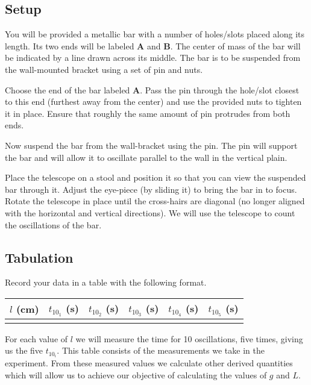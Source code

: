    \subsection*{Setup}

      You will be provided a metallic bar with a number of holes/slots placed along its length. Its two ends will be labeled \textbf{A} and \textbf{B}. The center of mass of the bar will be indicated by a line drawn across its middle. The bar is to be suspended from the wall-mounted bracket using a set of pin and nuts.

      Choose the end of the bar labeled \textbf{A}. Pass the pin through the hole/slot closest to this end (furthest away from the center) and use the provided nuts to tighten it in place. Ensure that roughly the same amount of pin protrudes from both ends.

      Now suspend the bar from the wall-bracket using the pin. The pin will support the bar and will allow it to oscillate parallel to the wall in the vertical plain.

      Place the telescope on a stool and position it so that you can view the suspended bar through it. Adjust the eye-piece (by sliding it) to bring the bar in to focus. Rotate the telescope in place until the cross-hairs are diagonal (no longer aligned with the horizontal and vertical directions). We will use the telescope to count the oscillations of the bar.

   \subsection*{Tabulation}

      Record your data in a table with the following format.

      \begin{table}[h]
         \centering

         \begin{tabular}{| c | c | c | c | c | c |}

            \hline
            $l$ (\si{\centi\metre}) & $t_{10_1}$ (\si{\second}) & $t_{10_2}$ (\si{\second}) & $t_{10_3}$ (\si{\second}) & $t_{10_4}$ (\si{\second}) & $t_{10_5}$ (\si{\second}) \\

            \hline
               & & & & & \\
            \hline

         \end{tabular}
      \end{table}
      For each value of $l$ we will measure the time for 10 oscillations, five times, giving us the five $t_{10_i}$. This table consists of the measurements we take in the experiment. From these measured values we calculate other derived quantities which will allow us to achieve our objective of calculating the values of $g$ and $L$. 

